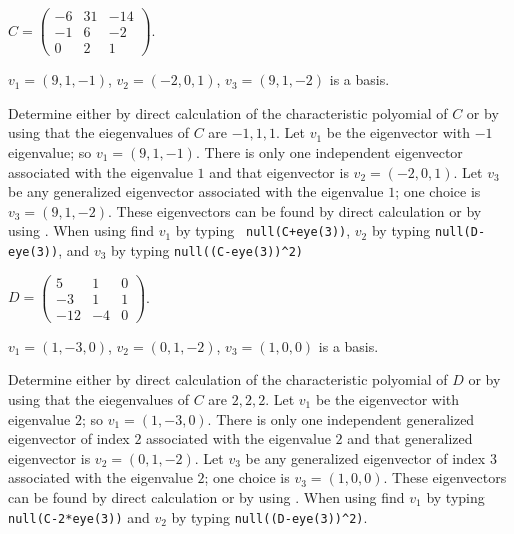 \documentclass{ximera}
\begin{document}
\begin{exercise} \label{c10.5.2c}
$C=\left(\begin{array}{rrr} -6 & 31 & -14 \\-1 & 6 & -2 \\ 0 & 2 & 1\end{array}
\right)$.

\begin{solution}
\ans $v_1=(9,1,-1)$, $v_2=(-2,0,1)$, $v_3=(9,1,-2)$ is a basis.

\soln  Determine either by direct calculation of the characteristic polyomial of $C$ 
or by using \Matlab that the eiegenvalues of $C$ are $-1,1,1$.  Let $v_1$ be the
eigenvector with $-1$ eigenvalue; so $v_1=(9,1,-1)$.  There is only one independent 
eigenvector associated with the eigenvalue $1$ and that eigenvector is
$v_2=(-2,0,1)$.  Let $v_3$ be any generalized eigenvector associated with the
eigenvalue $1$; one choice is $v_3=(9,1,-2)$.  These eigenvectors can be found by
direct calculation or by using \Matlab.  When using \Matlab find $v_1$ by typing {\tt
null(C+eye(3))}, $v_2$ by typing {\tt null(D-eye(3))}, and $v_3$ by typing 
{\tt null((C-eye(3))\^{}2)}

\end{solution}
\end{exercise}
\begin{exercise} \label{c10.5.2d}
$D=\left(\begin{array}{rrr} 5 & 1 & 0 \\-3 & 1 & 1 \\ -12 & -4 & 0\end{array}
\right)$.

\begin{solution}
\ans $v_1=(1,-3,0)$, $v_2=(0,1,-2)$, $v_3=(1,0,0)$ is a basis.

\soln  Determine either by direct calculation of the characteristic polyomial of $D$ 
or by using \Matlab that the eiegenvalues of $C$ are $2,2,2$.  Let $v_1$ be the
eigenvector with eigenvalue $2$; so $v_1=(1,-3,0)$.  There is only one independent 
generalized eigenvector of index $2$ associated with the eigenvalue $2$ and that 
generalized eigenvector is $v_2=(0,1,-2)$.  Let $v_3$ be any generalized eigenvector 
of index $3$ associated with the eigenvalue $2$; one choice is $v_3=(1,0,0)$.  These 
eigenvectors can be found by direct calculation or by using \Matlab.  When using 
\Matlab find $v_1$ by typing {\tt null(C-2*eye(3))} and $v_2$ by typing 
{\tt null((D-eye(3))\^{}2)}.

\end{solution}
\end{exercise}
\end{document}
